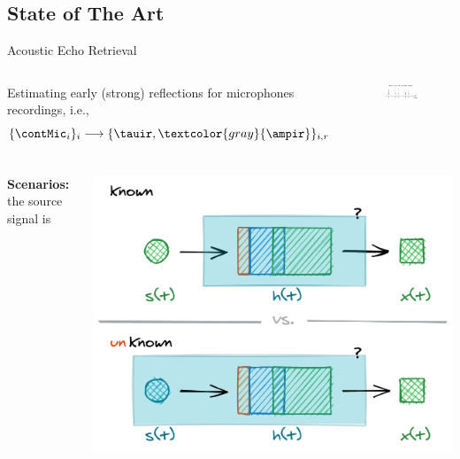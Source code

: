 \subsection*{State of The Art}

\begin{frame}[t]{Acoustic Echo Retrieval \hfill\faBook}
    \begin{columns}[T,onlytextwidth]
            Estimating early (strong) reflections for microphones recordings, i.e.,
            \begin{equation*}
                \{\contMic_i\}_i \longrightarrow \{ \tauir, \textcolor{gray}{\ampir} \}_{i,r}
            \end{equation*}
            \begin{figure}
                \centering
                \includegraphics[width=\textwidth]{./figures/arrivals.png}
            \end{figure}
    \end{columns}

    \vfill
    \begin{columns}[T,onlytextwidth]
        \textbf{Scenarios:} the source signal is

        \begin{center}
            \includegraphics[width=.9\textwidth]{./figures/active-passive.png}
        \end{center}


\end{columns}
\end{frame}
